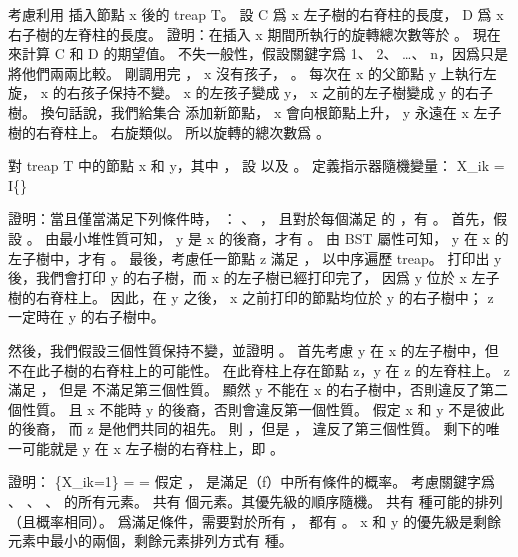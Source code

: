 \startitem%
考慮利用  插入節點 x 後的 treap T。
設 C 爲 x 左子樹的右脊柱的長度， D 爲 x 右子樹的左脊柱的長度。
證明：在插入 x 期間所執行的旋轉總次數等於 。
現在來計算 C 和 D 的期望值。
不失一般性，假設關鍵字爲 1、 2、 …、 n，因爲只是將他們兩兩比較。
\stopitem
\startANSWER
剛調用完 ， x 沒有孩子， 。
每次在 x 的父節點 y 上執行左旋， x 的右孩子保持不變。
 x 的左孩子變成 y， x 之前的左子樹變成 y 的右子樹。
換句話說，我們給集合  添加新節點， x 會向根節點上升，
 y 永遠在 x 左子樹的右脊柱上。
右旋類似。
所以旋轉的總次數爲 。
\stopANSWER

對 treap T 中的節點 x 和 y，其中 ，
設  以及 。
定義指示器隨機變量：
\startformula
X_{ik} = I\{\}
\stopformula

\startitem%
證明：當且僅當滿足下列條件時， ：
、 ，
且對於每個滿足  的 ，有 。
\stopitem
\startANSWER
首先，假設 。
由最小堆性質可知， y 是 x 的後裔，才有 。
由 BST 屬性可知， y 在 x 的左子樹中，才有 。
最後，考慮任一節點 z 滿足 ，
以中序遍歷 treap。
打印出 y 後，我們會打印 y 的右子樹，而 x 的左子樹已經打印完了，
因爲 y 位於 x 左子樹的右脊柱上。
因此，在 y 之後， x 之前打印的節點均位於 y 的右子樹中；
 z 一定時在 y 的右子樹中。

然後，我們假設三個性質保持不變，並證明 。
首先考慮 y 在 x 的左子樹中，但不在此子樹的右脊柱上的可能性。
在此脊柱上存在節點 z，y 在 z 的左脊柱上。
 z 滿足 ，
但是  不滿足第三個性質。
顯然 y 不能在 x 的右子樹中，否則違反了第二個性質。
且 x 不能時 y 的後裔，否則會違反第一個性質。
假定 x 和 y 不是彼此的後裔， 而 z 是他們共同的祖先。
則 ，但是 ，
違反了第三個性質。
剩下的唯一可能就是 y 在 x 左子樹的右脊柱上，即 。
\stopANSWER

\startitem%
證明：
\startformula
\Pr\{X_{ik}=1\} =  = 
\stopformula
\stopitem
\startANSWER
假定 ，  是滿足（f）中所有條件的概率。
考慮關鍵字爲 、 、 \m{\ldots}、  的所有元素。
共有  個元素。其優先級的順序隨機。
共有  種可能的排列（且概率相同）。
爲滿足條件，需要對於所有 ，
都有 。
 x 和 y 的優先級是剩餘元素中最小的兩個，剩餘元素排列方式有  種。
\stopANSWER

